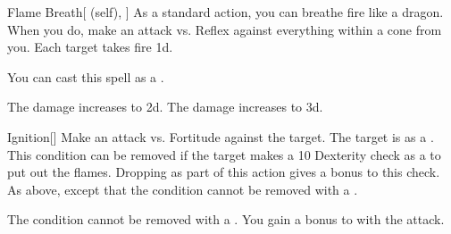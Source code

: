 \lowercase{\hypertarget{spell:Flame Breath}{}}\label{spell:Flame Breath}
\begin{attuneability}[Rank 4]{\hypertarget{spell:Flame Breath}{Flame Breath}}[ (self), ]
As a standard action, you can breathe fire like a dragon.
When you do, make an attack vs. Reflex against everything within a \arealarge cone from you.
\hit Each target takes fire  \plus1d.

You can cast this spell as a .

\rankline
{} The damage increases to  \plus2d.
 The damage increases to  \plus3d.
\end{attuneability}
\vspace{0.25em}



\lowercase{\hypertarget{spell:Ignition}{}}\label{spell:Ignition}
\begin{freeability}[Rank 4]{\hypertarget{spell:Ignition}{Ignition}}[]
Make an attack vs. Fortitude against the target.
\hit The target is  as a .
This condition can be removed if the target makes a  10 Dexterity check as a  to put out the flames.
Dropping  as part of this action gives a  bonus to this check.
\crit As above, except that the condition cannot be removed with a .

\rankline
{} The condition cannot be removed with a .
 You gain a  bonus to  with the attack.
\end{freeability}
\vspace{0.25em}



